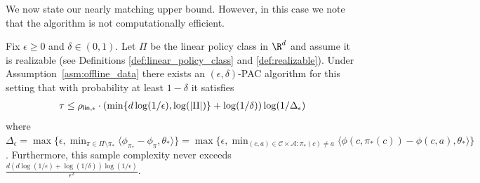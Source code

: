 \documentclass{article}
\newcommand{\mc}[1]{\mathcal{#1}}
\newcommand{\1}{\mathbf{1}}
\renewcommand{\v}{r} %
\begin{document}
\noindent We now state our nearly matching upper bound. However, in this case we note that the algorithm is not  computationally efficient.
\begin{theorem}\label{thm:realizable_upper}
Fix $\epsilon \geq 0$ and $\delta \in (0,1)$.
Let $\Pi$ be the linear policy class in $\R^d$ and assume it is realizable (see Definitions \ref{def:linear_policy_class} and \ref{def:realizable}).
Under Assumption~\ref{asm:offline_data} there exists an $(\epsilon,\delta)$-PAC algorithm for this setting that with probability at least $1-\delta$ it satisfies 
\begin{align*}
    \tau \leq \rho_{ {\sf lin},\epsilon} \cdot ( \min\{d\log(1/\epsilon), \log(|\Pi|) \} + \log(1/\delta) ) \log(1/\Delta_\epsilon)
\end{align*}
where $\displaystyle\Delta_\epsilon = \max\{ \epsilon, \min_{\pi \in \Pi \setminus \pi_*} \langle \phi_{\pi_*}-\phi_\pi , \theta_* \rangle  \} = \max\{ \epsilon, \min_{(c,a) \in \mc{C} \times \mc{A} : \pi_*(c) \neq a} \langle \phi(c,\pi_*(c))-\phi(c,a) , \theta_* \rangle  \}$. 
Furthermore, this sample complexity never exceeds $\frac{d(d\log(1/\epsilon)+\log(1/\delta)) \log(1/\epsilon)}{\epsilon^2}$.
\end{theorem}
\end{document}
